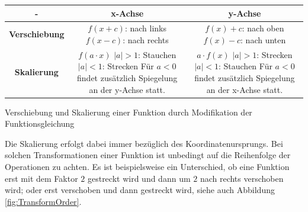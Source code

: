 \begin{listing}
    \begin{center}
        \begin{tabular}{ c | c | c }
            - & \textbf{x-Achse} & \textbf{y-Achse} \\
            \hline
            \textbf{Verschiebung} & \makecell{$f(x+c)$: nach links \\ $f(x-c)$: nach rechts} & \makecell{$f(x)+c$: nach oben \\ $f(x)-c$: nach unten} \\
            \hline
            \textbf{Skalierung} & \makecell{$f(a \cdot x)$ \\ $|a| > 1$: Stauchen \\ $|a| < 1$: Strecken \\ Für $a<0$ findet zusätzlich \\ Spiegelung an der y-Achse statt.} & \makecell{$a \cdot f(x)$ \\ $|a| > 1$: Strecken \\ $|a| < 1$: Stauchen \\ Für $a<0$ findet zusätzlich \\ Spiegelung an der x-Achse statt.}
        \end{tabular}
    \end{center}
    \caption[Verschiebung und Skalierung einer Funktion]{Verschiebung und Skalierung einer Funktion durch Modifikation der Funktionsgleichung}
    \label{lst:TranslateScaleFun}
\end{listing}

Die Skalierung erfolgt dabei immer bezüglich des Koordinatenursprungs. Bei solchen Transformationen einer Funktion ist unbedingt auf die Reihenfolge der Operationen zu achten. Es ist beispielsweise ein Unterschied, ob eine Funktion erst mit dem Faktor $2$ gestreckt wird und dann um $2$ nach rechts verschoben wird; oder erst verschoben und dann gestreckt wird, siehe auch Abbildung \ref{fig:TransformOrder}.

